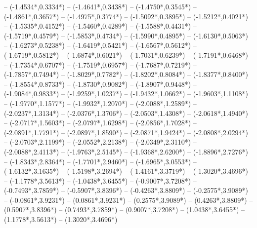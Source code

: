 {	-- ({-1.4534*\dx},{0.3334*\dy})
	-- ({-1.4641*\dx},{0.3438*\dy})
	-- ({-1.4750*\dx},{0.3545*\dy})
	-- ({-1.4861*\dx},{0.3657*\dy})
	-- ({-1.4975*\dx},{0.3774*\dy})
	-- ({-1.5092*\dx},{0.3895*\dy})
	-- ({-1.5212*\dx},{0.4021*\dy})
	-- ({-1.5335*\dx},{0.4152*\dy})
	-- ({-1.5460*\dx},{0.4289*\dy})
	-- ({-1.5588*\dx},{0.4431*\dy})
	-- ({-1.5719*\dx},{0.4579*\dy})
	-- ({-1.5853*\dx},{0.4734*\dy})
	-- ({-1.5990*\dx},{0.4895*\dy})
	-- ({-1.6130*\dx},{0.5063*\dy})
	-- ({-1.6273*\dx},{0.5238*\dy})
	-- ({-1.6419*\dx},{0.5421*\dy})
	-- ({-1.6567*\dx},{0.5612*\dy})
	-- ({-1.6719*\dx},{0.5812*\dy})
	-- ({-1.6874*\dx},{0.6021*\dy})
	-- ({-1.7031*\dx},{0.6239*\dy})
	-- ({-1.7191*\dx},{0.6468*\dy})
	-- ({-1.7354*\dx},{0.6707*\dy})
	-- ({-1.7519*\dx},{0.6957*\dy})
	-- ({-1.7687*\dx},{0.7219*\dy})
	-- ({-1.7857*\dx},{0.7494*\dy})
	-- ({-1.8029*\dx},{0.7782*\dy})
	-- ({-1.8202*\dx},{0.8084*\dy})
	-- ({-1.8377*\dx},{0.8400*\dy})
	-- ({-1.8554*\dx},{0.8733*\dy})
	-- ({-1.8730*\dx},{0.9082*\dy})
	-- ({-1.8907*\dx},{0.9448*\dy})
	-- ({-1.9084*\dx},{0.9833*\dy})
	-- ({-1.9259*\dx},{1.0237*\dy})
	-- ({-1.9432*\dx},{1.0662*\dy})
	-- ({-1.9603*\dx},{1.1108*\dy})
	-- ({-1.9770*\dx},{1.1577*\dy})
	-- ({-1.9932*\dx},{1.2070*\dy})
	-- ({-2.0088*\dx},{1.2589*\dy})
	-- ({-2.0237*\dx},{1.3134*\dy})
	-- ({-2.0376*\dx},{1.3706*\dy})
	-- ({-2.0503*\dx},{1.4308*\dy})
	-- ({-2.0618*\dx},{1.4940*\dy})
	-- ({-2.0717*\dx},{1.5603*\dy})
	-- ({-2.0797*\dx},{1.6298*\dy})
	-- ({-2.0856*\dx},{1.7028*\dy})
	-- ({-2.0891*\dx},{1.7791*\dy})
	-- ({-2.0897*\dx},{1.8590*\dy})
	-- ({-2.0871*\dx},{1.9424*\dy})
	-- ({-2.0808*\dx},{2.0294*\dy})
	-- ({-2.0703*\dx},{2.1199*\dy})
	-- ({-2.0552*\dx},{2.2138*\dy})
	-- ({-2.0349*\dx},{2.3110*\dy})
	-- ({-2.0088*\dx},{2.4113*\dy})
	-- ({-1.9763*\dx},{2.5145*\dy})
	-- ({-1.9368*\dx},{2.6200*\dy})
	-- ({-1.8896*\dx},{2.7276*\dy})
	-- ({-1.8343*\dx},{2.8364*\dy})
	-- ({-1.7701*\dx},{2.9460*\dy})
	-- ({-1.6965*\dx},{3.0553*\dy})
	-- ({-1.6132*\dx},{3.1635*\dy})
	-- ({-1.5198*\dx},{3.2694*\dy})
	-- ({-1.4161*\dx},{3.3719*\dy})
	-- ({-1.3020*\dx},{3.4696*\dy})
	-- ({-1.1778*\dx},{3.5613*\dy})
	-- ({-1.0438*\dx},{3.6455*\dy})
	-- ({-0.9007*\dx},{3.7208*\dy})
	-- ({-0.7493*\dx},{3.7859*\dy})
	-- ({-0.5907*\dx},{3.8396*\dy})
	-- ({-0.4263*\dx},{3.8809*\dy})
	-- ({-0.2575*\dx},{3.9089*\dy})
	-- ({-0.0861*\dx},{3.9231*\dy})
	-- ({0.0861*\dx},{3.9231*\dy})
	-- ({0.2575*\dx},{3.9089*\dy})
	-- ({0.4263*\dx},{3.8809*\dy})
	-- ({0.5907*\dx},{3.8396*\dy})
	-- ({0.7493*\dx},{3.7859*\dy})
	-- ({0.9007*\dx},{3.7208*\dy})
	-- ({1.0438*\dx},{3.6455*\dy})
	-- ({1.1778*\dx},{3.5613*\dy})
	-- ({1.3020*\dx},{3.4696*\dy})
}
